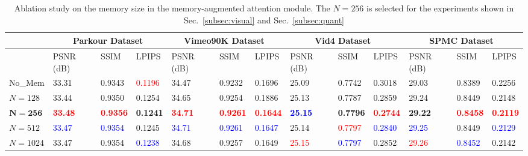\begin{table*}[t]
\footnotesize
\centering
\begin{tabular}{p{}||p{}<{\centering}|p{}<{\centering}|p{}<{\centering}||p{}<{\centering}|p{}<{\centering}|p{}<{\centering}||p{}<{\centering}|p{}<{\centering}|p{}<{\centering}||p{}<{\centering}|p{}<{\centering}|p{}<{\centering}}
            & \multicolumn{3}{c||}{Parkour Dataset} & \multicolumn{3}{c||}{Vimeo90K Dataset~\cite{vimeo90k}}    & \multicolumn{3}{c||}{Vid4 Dataset~\cite{frvsr}}  &  \multicolumn{3}{c}{SPMC Dataset~\cite{spmc}}     \\ \hline
            & PSNR (dB)          & SSIM    &LPIPS        & PSNR (dB) & SSIM &LPIPS  & PSNR (dB) & SSIM &LPIPS & PSNR (dB) & SSIM &LPIPS                        \\ \hline
No\_Mem     & 33.31              & 0.9343  &\textcolor{red}{0.1196}        & 34.47    & 0.9232 & 0.1696 & 25.09     & 0.7742  &0.3018 &29.03 &0.8389 &0.2256                    \\ \hline
$N=128$  & 33.44              & 0.9350     &0.1254     & 34.65       & 0.9254 &0.1886  & 25.13     & 0.7787  &0.2859 &29.24 &0.8449 & 0.2148                   \\ \hline
$\bm{N=256}$        & \textbf{\textcolor{red}{33.48}}              & \textbf{\textcolor{red}{0.9356}}    &\textbf{0.1241}      & \textbf{\textcolor{red}{34.71}}               & \textbf{\textcolor{red}{0.9261}} &\textbf{\textcolor{red}{0.1644}}  & \textbf{\textcolor{blue}{25.15}}     & \textbf{0.7796} &\textbf{\textcolor{red}{0.2744}} &\textbf{29.22} &\textbf{\textcolor{red}{0.8458}} &\textbf{\textcolor{red}{0.2119}}                     \\ \hline
$N=512$      & \textcolor{blue}{33.47}              & \textcolor{blue}{0.9354}   &0.1245       & \textcolor{blue}{34.71}               & \textcolor{blue}{0.9261} &\textcolor{blue}{0.1647}  & 25.14     & \textcolor{red}{0.7797}  &\textcolor{blue}{0.2840} &\textcolor{blue}{29.25} &0.8449 &\textcolor{blue}{0.2129}                    \\ \hline
$N=1024$         & 33.47 & 0.9354  &\textcolor{blue}{0.1238}  & 34.68   & 0.9257 &0.1649   & \textcolor{red}{25.15}     & \textcolor{blue}{0.7797}   &0.2852 &\textcolor{red}{29.26} &\textcolor{blue}{0.8452} &0.2142                   \\ \hline
\end{tabular}
\caption{Ablation study on the memory size in the memory-augmented attention module. The $N=256$ is selected for the experiments shown in Sec.~\ref{subsec:visual} and Sec.~\ref{subsec:quant}}
\label{tab:ablation}
\end{table*}

